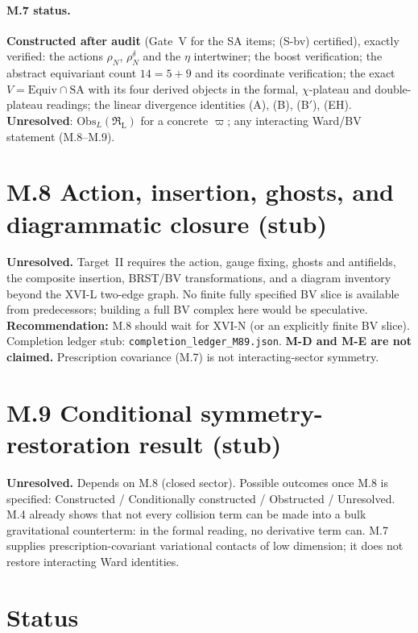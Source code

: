 \documentclass{article}
\theoremstyle{remark}
\newcommand{\RL}{\mathfrak R_{\mathrm L}}
\begin{document}
\paragraph{M.7 status.}
\textbf{Constructed after audit} (Gate~V for the SA items; (S-bv) certified), exactly verified: the actions $\rho_N$, $\rho^\delta_N$ and the $\eta$ intertwiner; the boost verification; the abstract equivariant count $14=5+9$ and its coordinate verification; the exact $V=\mathrm{Equiv}\cap\mathrm{SA}$ with its four derived objects in the formal, $\chi$-plateau and double-plateau readings; the linear divergence identities (A), (B), (B$'$), (EH).
\textbf{Unresolved}: $\mathrm{Obs}_L(\RL)$ for a concrete $\varpi$; any interacting Ward/BV statement (M.8--M.9).


\section{M.8 Action, insertion, ghosts, and diagrammatic closure (stub)}
\label{sec:m8}
\textbf{Unresolved.} Target~II requires the action, gauge fixing, ghosts and antifields, the composite insertion, BRST/BV transformations, and a diagram inventory beyond the XVI-L two-edge graph.
No finite fully specified BV slice is available from predecessors; building a full BV complex here would be speculative.
\textbf{Recommendation:} M.8 should wait for XVI-N (or an explicitly finite BV slice).
Completion ledger stub: \texttt{completion\_ledger\_M89.json}.
\textbf{M-D and M-E are not claimed.} Prescription covariance (M.7) is not interacting-sector symmetry.

\section{M.9 Conditional symmetry-restoration result (stub)}
\label{sec:m9}
\textbf{Unresolved.} Depends on M.8 (closed sector).
Possible outcomes once M.8 is specified: Constructed / Conditionally constructed / Obstructed / Unresolved.
M.4 already shows that not every collision term can be made into a bulk gravitational counterterm: in the formal reading, no derivative term can.
M.7 supplies prescription-covariant variational contacts of low dimension; it does not restore interacting Ward identities.

\section{Status}
\label{sec:status}
\end{document}
